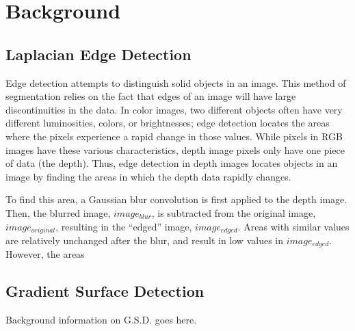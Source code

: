 
\section{Background}
\label{sec:background}

\subsection{Laplacian Edge Detection}
\label{subsec:laplacian}
Edge detection attempts to distinguish solid objects in an image. This
method of segmentation relies on the fact that edges of an image will
have large discontinuities in the data. In color images, two different
objects often have very different luminosities, colors, or
brightnesses; edge detection locates the areas where the pixels
experience a rapid change in those values. While pixels in RGB images
have these various characteristics, depth image pixels only have one
piece of data (the depth). Thus, edge detection in depth images
locates objects in an image by finding the areas in which the depth
data rapidly changes. 

To find this area, a Gaussian blur convolution is first applied to the
depth image. Then, the blurred image, $image_{blur}$, is subtracted
from the original image, $image_{original}$, resulting in the
``edged'' image, $image_{edged}$. Areas with similar values are
relatively unchanged after the blur, and result in low values in
$image_{edged}$. However, the areas    

\subsection{Gradient Surface Detection}
\label{subsec:gradient}
Background information on G.S.D. goes here.


